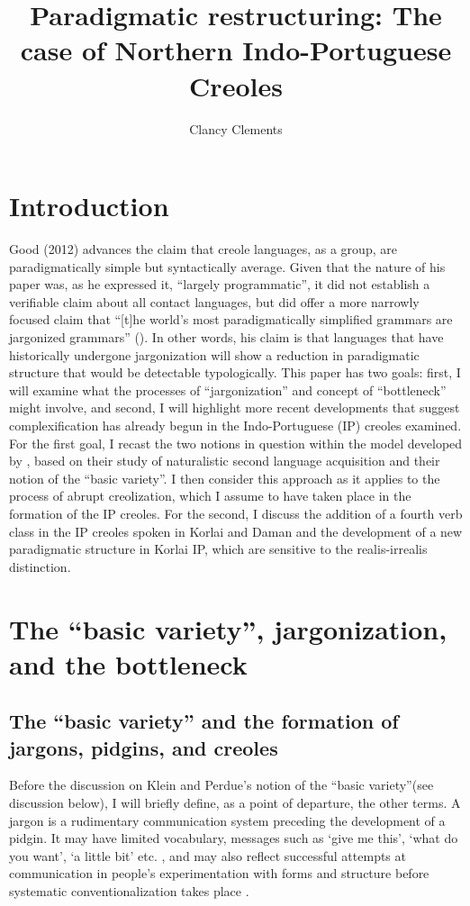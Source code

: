 \documentclass[output=paper,colorlinks,citecolor=brown]{langscibook}
\author{Clancy Clements\orcid{}\affiliation{Indiana University}}
\title[Paradigmatic restructuring]{Paradigmatic restructuring: The case of Northern Indo-Portuguese Creoles}
\begin{document}
\maketitle

\section{Introduction}

Good (2012) advances the claim that creole languages, as a group, are paradigmatically simple but syntactically average. Given that the nature of his paper was, as he expressed it, “largely programmatic”, it did not establish a verifiable claim about all contact languages, but did offer a more narrowly focused claim that “[t]he world’s most paradigmatically simplified grammars are jargonized grammars” (\citeyear[37]{Good2012}). In other words, his claim is that languages that have historically undergone jargonization will show a reduction in paradigmatic structure that would be detectable typologically. This paper has  two goals: first, I will examine what the processes of “jargonization” and concept of “bottleneck” might involve, and second, I will highlight more recent developments that suggest complexification has already begun in the Indo-Portuguese (IP) creoles examined. For the first goal, I recast the two notions in question within the model developed by \citep{KleinPerdue1992, KleinPerdue1997}, based on their study of naturalistic second language acquisition and their notion of the “basic variety”. I then consider this approach as it applies to the process of abrupt creolization, which I assume to have taken place in the formation of the IP creoles. For the second, I discuss the addition of a fourth verb class in the IP creoles spoken in Korlai and Daman and the development of a new paradigmatic structure in Korlai IP, which are sensitive to the realis-irrealis distinction.


\section{The “basic variety”, jargonization, and the bottleneck}

\subsection{The “basic variety” and the formation of jargons, pidgins, and creoles}

Before the discussion on Klein and Perdue's notion of the “basic variety”(see discussion below), I will briefly define, as a point of departure, the other terms. A jargon is a rudimentary communication system preceding the development of a pidgin. It may have limited vocabulary, messages such as `give me this', `what do you want', `a little bit' etc. \citep[29]{Bakker1994}, and may also reflect successful attempts at communication in people’s experimentation with forms and structure before systematic conventionalization takes place  
\citep{Bakker2003}.
 
\end{document}
